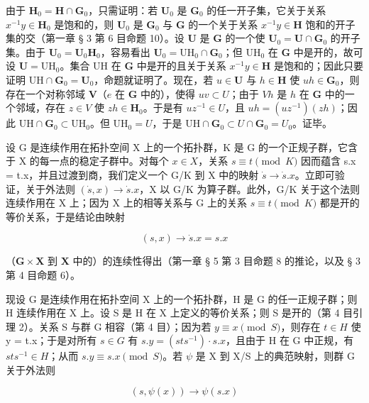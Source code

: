 由于 \(\mathbf{H}_0 = \mathbf{H} \cap \mathbf{G}_0\)，只需证明：若 \(\mathbf{U}_0\) 是 \(\mathbf{G}_0\) 的任一开子集，它关于关系 \(x^{-1}y \in \mathbf{H}_0\) 是饱和的，则 \(\mathbf{U}_0\) 是 \(\mathbf{G}_0\) 与 \(\mathbf{G}\) 的一个关于关系 \(x^{-1}y \in \mathbf{H}\) 饱和的开子集的交（第一章 § 3 第 6 目命题 10）。设 \(\mathbf{U}\) 是 \(\mathbf{G}\) 的一个使 \(\mathbf{U}_0 = \mathbf{U} \cap \mathbf{G}_0\) 的开子集。由于 \(\mathbf{U}_0 = \mathbf{U}_0\mathbf{H}_0\)，容易看出 \(\mathbf{U}_0 = \mathrm{UH}_0 \cap \mathbf{G}_0\)；但 \(\mathrm{UH}_0\) 在 \(\mathbf{G}\) 中是开的，故可设 \(\mathbf{U} = \mathrm{UH}_0\)。集合 \(\mathrm{UH}\) 在 \(\mathbf{G}\) 中是开的且关于关系 \(x^{-1}y \in \mathbf{H}\) 是饱和的；因此只要证明 \(\mathrm{UH} \cap \mathbf{G}_0 = \mathbf{U}_0\)，命题就证明了。现在，若 \(u \in \mathbf{U}\) 与 \(h \in \mathbf{H}\) 使 \(uh \in \mathbf{G}_0\)，则存在一个对称邻域 \(\mathbf{V}\)（\(e\) 在 \(\mathbf{G}\) 中的），使得 \(uv \subset U\)；由于 \(Vh\) 是 \(h\) 在 \(\mathbf{G}\) 中的一个邻域，存在 \(z \in V\) 使 \(zh \in \mathbf{H}_0\)。于是有 \(uz^{-1} \in U\)，且 \(uh = (uz^{-1})(zh)\)；因此 \(\mathrm{UH} \cap \mathbf{G}_0 \subset \mathrm{UH}_0\)。但 \(\mathrm{UH}_0 = U\)，于是 \(\mathrm{UH} \cap \mathbf{G}_0 \subset U \cap \mathbf{G}_0 = U_0\)。证毕。

设 G 是连续作用在拓扑空间 X 上的一个拓扑群，K 是 G 的一个正规子群，它含于 X 的每一点的稳定子群中。对每个 \(x \in X\)，关系 \(s \equiv t \pmod{K}\) 因而蕴含 s.x = t.x，并且过渡到商，我们定义一个 G/K 到 X 中的映射 \(\dot{s} \to \dot{s}.x\)。立即可验证，关于外法则 \((\dot{s}, x) \to \dot{s}.x\)，X 以 G/K 为算子群。此外，G/K 关于这个法则连续作用在 X 上；因为 X 上的相等关系与 G 上的关系 \(s \equiv t \pmod{K}\) 都是开的等价关系，于是结论由映射

\[
(s, x) \rightarrow \dot {s}. x = s. x
\]

（\(\mathbf{G} \times \mathbf{X}\) 到 \(\mathbf{X}\) 中的）的连续性得出（第一章 § 5 第 3 目命题 8 的推论，以及 § 3 第 4 目命题 6）。

现设 G 是连续作用在拓扑空间 X 上的一个拓扑群，H 是 G 的任一正规子群；则 H 连续作用在 X 上。设 S 是 H 在 X 上定义的等价关系；则 S 是开的（第 4 目引理 2）。关系 S 与群 G 相容（第 4 目）；因为若 \(y \equiv x \pmod{S}\)，则存在 \(t \in H\) 使 y = t.x；于是对所有 \(s \in G\) 有 \(s.y = (sts^{-1}) \cdot s.x\)，且由于 H 在 G 中正规，有 \(sts^{-1} \in H\)；从而 \(s.y \equiv s.x \pmod{S}\)。若 \(\psi\) 是 X 到 X/S 上的典范映射，则群 G 关于外法则

\[
(s, \psi (x)) \rightarrow \psi (s. x)
\]

